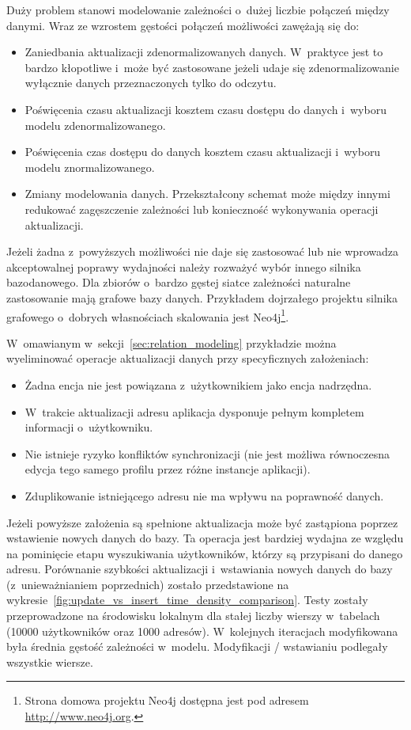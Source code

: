 Duży problem stanowi modelowanie zależności o~dużej liczbie połączeń między danymi. Wraz ze wzrostem gęstości połączeń możliwości zawężają się do:

\begin{itemize}
	\item Zaniedbania aktualizacji zdenormalizowanych danych. W~praktyce jest to bardzo kłopotliwe i~może być zastosowane jeżeli udaje się zdenormalizowanie wyłącznie danych przeznaczonych tylko do odczytu.
	\item Poświęcenia czasu aktualizacji kosztem czasu dostępu do danych i~wyboru modelu zdenormalizowanego.
	\item Poświęcenia czas dostępu do danych kosztem czasu aktualizacji i~wyboru modelu znormalizowanego.
	\item Zmiany modelowania danych. Przekształcony schemat może między innymi redukować zagęszczenie zależności lub konieczność wykonywania operacji aktualizacji.
\end{itemize}

Jeżeli żadna z~powyższych możliwości nie daje się zastosować lub nie wprowadza akceptowalnej poprawy wydajności należy rozważyć wybór innego silnika bazodanowego. Dla zbiorów o~bardzo gęstej siatce zależności naturalne zastosowanie mają grafowe bazy danych. Przykładem dojrzałego projektu silnika grafowego o~dobrych własnościach skalowania jest Neo4j\footnote{Strona domowa projektu Neo4j dostępna jest pod adresem \url{http://www.neo4j.org}.}. 

W~omawianym w~sekcji~\ref{sec:relation_modeling} przykładzie można wyeliminować operacje aktualizacji danych przy specyficznych założeniach:

\begin{itemize}
	\item Żadna encja nie jest powiązana z~użytkownikiem jako encja nadrzędna.
	\item W~trakcie aktualizacji adresu aplikacja dysponuje pełnym kompletem informacji o~użytkowniku.
	\item Nie istnieje ryzyko konfliktów synchronizacji (nie jest możliwa równoczesna edycja tego samego profilu przez różne instancje aplikacji).
	\item Zduplikowanie istniejącego adresu nie ma wpływu na poprawność danych.
\end{itemize} 

Jeżeli powyższe założenia są spełnione aktualizacja może być zastąpiona poprzez wstawienie nowych danych do bazy. Ta operacja jest bardziej wydajna ze względu na pominięcie etapu wyszukiwania użytkowników, którzy są przypisani do danego adresu. Porównanie szybkości aktualizacji i~wstawiania nowych danych do bazy (z~unieważnianiem poprzednich) zostało przedstawione na wykresie~\ref{fig:update_vs_insert_time_density_comparison}. Testy zostały przeprowadzone na środowisku lokalnym dla stałej liczby wierszy w~tabelach (10000 użytkowników oraz 1000 adresów). W~kolejnych iteracjach modyfikowana była średnia gęstość zależności w~modelu. Modyfikacji / wstawianiu podlegały wszystkie wiersze.

